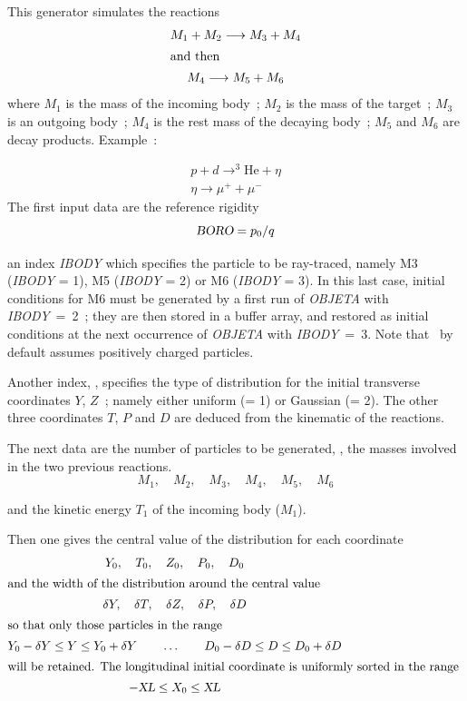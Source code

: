 This generator simulates the reactions 
%
\begin{gather*}
     M_1+M_2 \longrightarrow  M_3+M_4  \\
\intertext{and then} 
     M_4 \longrightarrow  M_5 + M_6 
\end{gather*}
%
where  $ M_1 $ is the mass of the incoming body~; $ M_2 $ is the mass
of the target~;  $ M_3 $ is an outgoing body~;  $ M_4 $ is the rest mass of the
decaying body~; $ M_5 $ and $ M_6 $ are decay products. Example~: 

  \begin{gather*}
	  p+d \longrightarrow^3 \text{He}  + \eta  \\
	 \eta  \longrightarrow  \mu^ ++ \mu^-
  \end{gather*}
%   
\noindent The first input data are the reference rigidity 
$$ \textsl{BORO} = p_0 /  q $$

\noindent an index \textsl{IBODY} which specifies the particle to be ray-traced, namely
M3 (\textsl{IBODY} = 1),  M5 (\textsl{IBODY} = 2) or M6 (\textsl{IBODY} = 3).  In this last case, 
initial conditions for M6 must be generated by a first run of \textsl{OBJETA} with 
\mbox{\textsl{IBODY} = 2}~;  they are then stored in a buffer array, and restored as initial conditions
at the next occurrence of \textsl{OBJETA} with \mbox{\textsl{IBODY} = 3}. Note that
\zgou\ by default assumes positively charged particles.  
\bigskip

\noindent Another index, \KOBJ,  specifies the type of
distribution for the initial transverse coordinates $ Y$, $Z $~;   
namely either uniform (\KOBJ = 1) or Gaussian 
(\KOBJ = 2).  The other three coordinates $ T$, $P$ and $ D $ are 
deduced from the kinematic of the reactions.   
\bigskip

\noindent The next data are the number of particles to be generated, 
\IMAX{},  the masses involved  in the two previous
reactions. 
 $$ M_1,\quad M_2,\quad M_3,\quad M_4,\quad M_5,\quad M_6 $$

\noindent  and the kinetic energy $ T_1 $ of the incoming body ($M_1$). 
 
\noindent Then one gives the central value of the distribution for each
coordinate 
%
\begin{gather*}
	Y_0,\quad T_0,\quad Z_0,\quad P_0,\quad D_0    \\
\intertext{and the width of the distribution around the central value }
	 \delta Y,\quad \delta T,\quad \delta Z,\quad \delta P,\quad \delta D \\
\intertext{so that only those particles in the range }
	Y_0-\delta Y\leq Y\leq Y_0+\delta Y\qquad \ldots \qquad D_0-\delta
	D\leq D\leq D_0+\delta D  \\
\intertext{will be retained.  The longitudinal initial coordinate is uniformly
	sorted in the range }
	 -\textsl{XL} \leq  X_0 \leq  \textsl{XL} 
\end{gather*}
 
